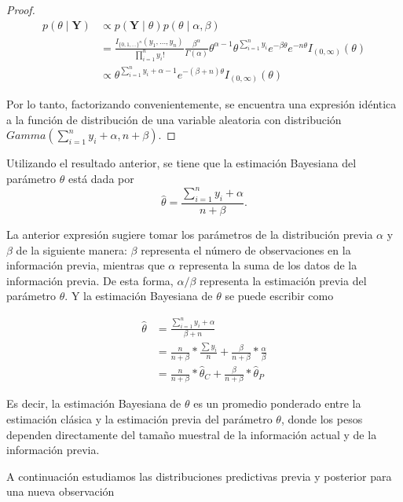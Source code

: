 \documentclass[
  10pt,
  spanish,
]{book}
\theoremstyle{definition}
\theoremstyle{definition}
\theoremstyle{definition}
\theoremstyle{definition}
\theoremstyle{remark}
\begin{document}
\begin{proof}
{}\begin{align*}
p(\theta \mid \mathbf{Y})&\propto p(\mathbf{Y} \mid \theta)p(\theta \mid \alpha,\beta)\\
&=\frac{I_{\{0,1,\ldots\}^n}(y_1,\ldots,y_n)}{\prod_{i=1}^ny_i!}\frac{\beta^\alpha}{\Gamma(\alpha)}
\theta^{\alpha-1}\theta^{\sum_{i=1}^ny_i}e^{-\beta\theta}e^{-n\theta}I_{(0,\infty)}(\theta)\\
&\propto \theta^{\sum_{i=1}^ny_i+\alpha-1}e^{-(\beta+n)\theta}I_{(0,\infty)}(\theta)
\end{align*}

Por lo tanto, factorizando convenientemente, se encuentra una expresión idéntica a la función de distribución de una variable aleatoria con distribución \(Gamma(\sum_{i=1}^ny_i+\alpha,n+\beta)\).
\end{proof}

Utilizando el resultado anterior, se tiene que la estimación Bayesiana del parámetro \(\theta\) está dada por
\begin{equation*}
\hat{\theta}=\frac{\sum_{i=1}^ny_i+\alpha}{n+\beta}.
\end{equation*}

La anterior expresión sugiere tomar los parámetros de la distribución previa \(\alpha\) y \(\beta\) de la siguiente manera: \(\beta\) representa el número de observaciones en la información previa, mientras que \(\alpha\) representa la suma de los datos de la información previa. De esta forma, \(\alpha/\beta\) representa la estimación previa del parámetro \(\theta\). Y la estimación Bayesiana de \(\theta\) se puede escribir como

\begin{align*}
\hat{\theta}&=\frac{\sum_{i=1}^ny_i+\alpha}{\beta+n}\\
&=\frac{n}{n+\beta}*\frac{\sum y_i}{n}+\frac{\beta}{n+\beta}*\frac{\alpha}{\beta}\\
&=\frac{n}{n+\beta}*\hat{\theta}_C+\frac{\beta}{n+\beta}*\hat{\theta}_P
\end{align*}

Es decir, la estimación Bayesiana de \(\theta\) es un promedio ponderado entre la estimación clásica y la estimación previa del parámetro \(\theta\), donde los pesos dependen directamente del tamaño muestral de la información actual y de la información previa.

A continuación estudiamos las distribuciones predictivas previa y posterior para una nueva observación
\end{document}
